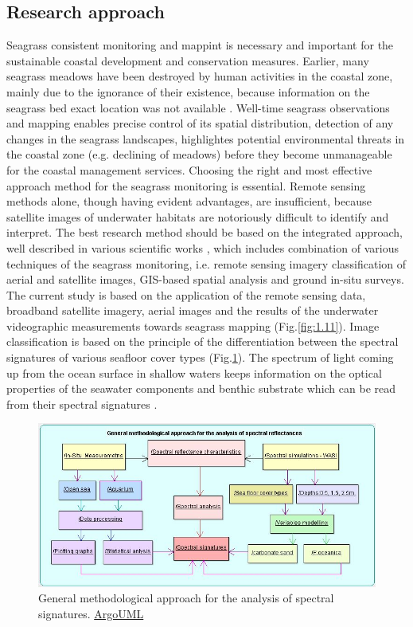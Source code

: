 \documentclass[10pt, a4paper]{article}
\begin{document}
\subsection{Research approach}
Seagrass consistent monitoring and mappint is necessary and important for the sustainable coastal
development and conservation measures. Earlier, many seagrass meadows have been destroyed by
human activities in the coastal zone, mainly due to the ignorance of their existence, because
information on the seagrass bed exact location was not available \cite{Choo06}\label{Choo06}. Well-time seagrass
observations and mapping enables precise control of its spatial distribution, detection of any changes
in the seagrass landscapes, highlightes potential environmental threats in the coastal zone (e.g.
declining of meadows) before they become unmanageable for the coastal management services.
Choosing the right and most effective approach method for the seagrass monitoring is essential.
Remote sensing methods alone, though having evident advantages, are insufficient, because satellite
images of underwater habitats are notoriously difficult to identify and interpret. The best research
method should be based on the integrated approach, well described in various scientific works \cite{Brown02,Montefalcone06,Kirkman96}\label{Brown02} \label{Montefalcone06} \label{Kirkman96}, which includes combination of various
techniques of the seagrass monitoring, i.e. remote sensing imagery classification of aerial and satellite
images, GIS-based spatial analysis and ground in-situ surveys.
The current study is based on the application of the remote sensing data, broadband satellite imagery,
aerial images and the results of the underwater videographic measurements towards seagrass
mapping  (Fig.\ref{fig:1.11}). Image classification is based on the principle of the differentiation between the spectral
signatures of various seafloor cover types  (Fig.\ref{fig:1.10}). The spectrum of light coming up from the ocean surface in
shallow waters keeps information on the optical properties of the seawater components and benthic
substrate which can be read from their spectral signatures \cite{Werdell03}\label{Werdell03}. \\

\begin{figure}[h]
	\centering
	\includegraphics[scale=0.48]{UML_ClassDiagram.jpg}
	\caption{General methodological approach for the analysis of spectral signatures. \href{http://argouml.tigris.org/}{ArgoUML}}
	\label{fig:1.10}
\end{figure}
\end{document}
